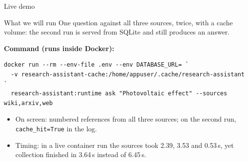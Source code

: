 \documentclass[aspectratio=169,11pt]{beamer}
\begin{document}
\begin{frame}[fragile]{Live demo}
  \begin{block}{What we will run}
    One question against all three sources, twice, with a cache volume: the second run is
    served from SQLite and still produces an answer.
  \end{block}

  \vspace{0.3em}
  \textbf{Command (runs inside Docker):}
\begin{lstlisting}[style=shell]
docker run --rm --env-file .env --env DATABASE_URL= `
  -v research-assistant-cache:/home/appuser/.cache/research-assistant `
  research-assistant:runtime ask "Photovoltaic effect" --sources wiki,arxiv,web
\end{lstlisting}

  \vspace{0.3em}
  \begin{itemize}\small\setlength\itemsep{0.3em}
    \item On screen: numbered references from all three sources; on the second run,
      \texttt{cache\_hit=True} in the log.
    \item Timing: in a live container run the sources took 2.39, 3.53 and 0.53\,s, yet
      collection finished in 3.64\,s instead of 6.45\,s.
  \end{itemize}
\end{frame}
\end{document}
